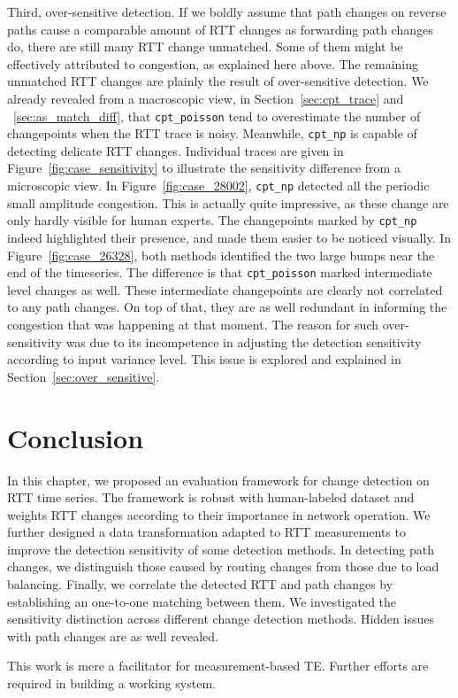 Third, over-sensitive detection.
If we boldly assume that path changes on reverse paths cause a comparable amount of RTT changes as forwarding path changes do, there are still many RTT change unmatched.
Some of them might be effectively attributed to congestion, as explained here above.
The remaining unmatched RTT changes are plainly the result of over-sensitive detection.
We already revealed from a macroscopic view, in Section~\ref{sec:cpt_trace} and ~\ref{sec:as_match_diff}, that \texttt{cpt\_poisson} tend to overestimate the number of changepoints when the RTT trace is noisy.
Meanwhile, \texttt{cpt\_np} is capable of detecting delicate RTT changes. 
Individual traces are given in Figure~\ref{fig:case_sensitivity} to illustrate the sensitivity difference from a microscopic view. 
In Figure~\ref{fig:case_28002}, \texttt{cpt\_np} detected all the periodic small amplitude congestion.
This is actually quite impressive, as these change are only hardly visible for human experts.
The changepoints marked by \texttt{cpt\_np} indeed highlighted their presence, and made them easier to be noticed visually.
In Figure~\ref{fig:case_26328}, both methods identified the two large bumps near the end of the timeseries.
The difference is that \texttt{cpt\_poisson} marked intermediate level changes as well.
These intermediate changepoints are clearly not correlated to any path changes.
On top of that, they are as well redundant in informing the congestion that was happening at that moment.
The reason for such over-sensitivity was due to its incompetence in adjusting the detection sensitivity according to input variance level. This issue is explored and explained in Section~\ref{sec:over_sensitive}.

\section*{Conclusion}
In this chapter, we proposed an evaluation framework for change detection on RTT time series.
The framework is robust with human-labeled dataset and weights RTT changes according to their importance in network operation. 
We further designed a data transformation adapted to RTT measurements to improve the detection sensitivity of some detection methods.
In detecting path changes, we distinguish those caused by routing changes from those due to load balancing.
Finally, we correlate the detected RTT and path changes by establishing an one-to-one matching between them. 
We investigated the sensitivity distinction across different change detection methods. 
Hidden issues with path changes are as well revealed.

This work is mere a facilitator for measurement-based TE. 
Further efforts are required in building a working system.
